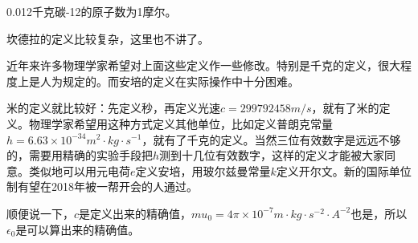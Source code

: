 0.012千克碳-12的原子数为1摩尔。

坎德拉的定义比较复杂，这里也不讲了。

近年来许多物理学家希望对上面这些定义作一些修改。特别是千克的定义，很大程度上是人为规定的。而安培的定义在实际操作中十分困难。

米的定义就比较好：先定义秒，再定义光速$c=299792458 \unit{m/s}$，就有了米的定义。物理学家希望用这种方式定义其他单位，比如定义普朗克常量$h=6.63 \times 10^{-34} \unit{m^2\cdot kg \cdot s^{-1}}$，就有了千克的定义。当然三位有效数字是远远不够的，需要用精确的实验手段把$h$测到十几位有效数字，这样的定义才能被大家同意。类似地可以用元电荷$e$定义安培，用玻尔兹曼常量$k$定义开尔文。新的国际单位制有望在2018年被一帮开会的人通过。

顺便说一下，$c$是定义出来的精确值，$mu_0=4 \pi \times 10^{-7} \unit{m \cdot kg \cdot s^{-2} \cdot A^{-2}}$也是，所以$\epsilon_0$是可以算出来的精确值。
